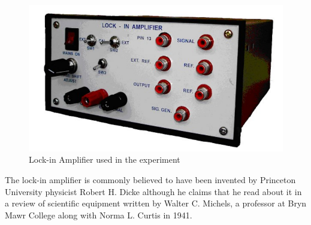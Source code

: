 \documentclass[%
 reprint,
nofootinbib,
 amsmath,amssymb,
 aps,
]{revtex4-2}
\begin{document}
    \par
    \begin{figure}
        \centering
        \includegraphics[scale = 0.5]{Figures/lockin.png}
        \caption{Lock-in Amplifier used in the experiment}
        \label{fig:lockin}
    \end{figure}
    \par
    The lock-in amplifier is commonly believed to have been invented by Princeton University physicist Robert H. Dicke although he claims that he read about it in a review of scientific equipment written by Walter C. Michels, a professor at Bryn Mawr College along with Norma L. Curtis in 1941.
    
\end{document}
